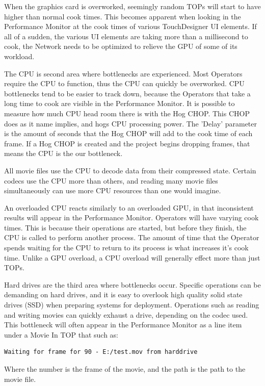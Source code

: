 \begin{fullwidth}
When the graphics card is overworked, seemingly random TOPs will start to have higher than normal cook times. This becomes apparent when looking in the Performance Monitor at the cook times of various TouchDesigner UI elements. If all of a sudden, the various UI elements are taking more than a millisecond to cook, the Network needs to be optimized to relieve the GPU of some of its workload. 

The CPU is second area where bottlenecks are experienced. Most Operators require the CPU to function, thus the CPU can quickly be overworked. CPU bottlenecks tend to be easier to track down, because the Operators that take a long time to cook are visible in the Performance Monitor. It is possible to measure how much CPU head room there is with the Hog CHOP. This CHOP does as it name implies, and hogs CPU processing power. The 'Delay' parameter is the amount of seconds that the Hog CHOP will add to the cook time of each frame. If a Hog CHOP is created and the project begins dropping frames, that means the CPU is the our bottleneck. 

All movie files use the CPU to decode data from their compressed state. Certain codecs use the CPU more than others, and reading many movie files simultaneously can use more CPU resources than one would imagine.

An overloaded CPU reacts similarly to an overloaded GPU, in that inconsistent results will appear in the Performance Monitor. Operators will have varying cook times. This is because their operations are started, but before they finish, the CPU is called to perform another process. The amount of time that the Operator spends waiting for the CPU to return to its process is what increases it's cook time. Unlike a GPU overload, a CPU overload will generally effect more than just TOPs.

Hard drives are the third area where bottlenecks occur. Specific operations can be demanding on hard drives, and it is easy to overlook high quality solid state drives (SSD) when preparing systems for deployment. Operations such as reading and writing movies can quickly exhaust a drive, depending on the codec used. This bottleneck will often appear in the Performance Monitor as a line item under a Movie In TOP that such as:

\begin{lstlisting}
Waiting for frame for 90 - E:/test.mov from harddrive
\end{lstlisting}

\noindent Where the number is the frame of the movie, and the path is the path to the movie file.

\end{fullwidth}

